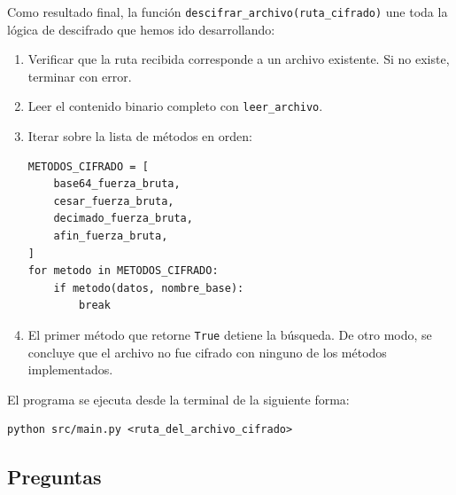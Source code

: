 \documentclass[12pt, a4paper]{article}
\begin{document}
Como resultado final, la función \texttt{descifrar\_archivo(ruta\_cifrado)} une toda la lógica de descifrado
que hemos ido desarrollando:

\begin{enumerate}
    \item Verificar que la ruta recibida corresponde a un archivo existente.
          Si no existe, terminar con error.
    \item Leer el contenido binario completo con \texttt{leer\_archivo}.
    \item Iterar sobre la lista de métodos en orden:
\begin{verbatim}
METODOS_CIFRADO = [
    base64_fuerza_bruta,
    cesar_fuerza_bruta,
    decimado_fuerza_bruta,
    afin_fuerza_bruta,
]
for metodo in METODOS_CIFRADO:
    if metodo(datos, nombre_base):
        break
\end{verbatim}
    \item El primer método que retorne \texttt{True} detiene la búsqueda. De otro modo, se concluye que 
          el archivo no fue cifrado con ninguno de los métodos implementados.
\end{enumerate}

El programa se ejecuta desde la terminal de la siguiente forma:

\begin{verbatim}
python src/main.py <ruta_del_archivo_cifrado>
\end{verbatim}


\subsection{Preguntas}
\end{document}
